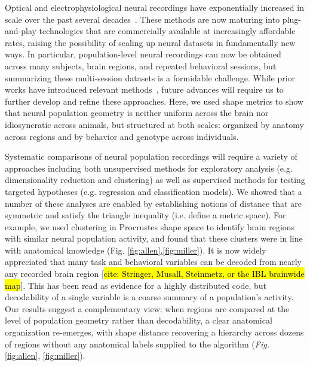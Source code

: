 Optical and electrophysiological neural recordings have exponentially increased in scale over the past several decades~\parencite{stevenson2011advances,urai2022large}.
These methods are now maturing into plug-and-play technologies that are commercially available at increasingly affordable rates, raising the possibility of scaling up neural datasets in fundamentally new ways.
In particular, population-level neural recordings can now be obtained across many subjects, brain regions, and repeated behavioral sessions, but summarizing these multi-session datasets is a formidable challenge.
While prior works have introduced relevant methods~\parencite[see][for a review]{klabunde2023similarity}, future advances will require us to further develop and refine these approaches.
Here, we used shape metrics to show that neural population geometry is neither uniform across the brain nor idiosyncratic across animals, but structured at both scales: organized by anatomy across regions and by behavior and genotype across individuals.


Systematic comparisons of neural population recordings will require a variety of approaches including both unsupervised methods for exploratory analysis (e.g. dimensionality reduction and clustering) as well as supervised methods for testing targeted hypotheses (e.g. regression and classification models).
We showed that a number of these analyses are enabled by establishing notions of distance that are symmetric and satisfy the triangle inequality (i.e. define a metric space).
For example, we used clustering in Procrustes shape space to identify brain regions with similar neural population activity, and found that these clusters were in line with anatomical knowledge (Fig. \ref{fig:allen},\ref{fig:miller}).
It is now widely appreciated that many task and behavioral variables can be decoded from nearly any recorded brain region [\hl{cite: Stringer, Musall, Steinmetz, or the IBL brainwide map}]. This has been read as evidence for a highly distributed code, but decodability of a single variable is a coarse summary of a population's activity. Our results suggest a complementary view: when regions are compared at the level of population geometry rather than decodability, a clear anatomical organization re-emerges, with shape distance recovering a hierarchy across dozens of regions without any anatomical labels supplied to the algorithm (\textit{Fig.} \ref{fig:allen}, \ref{fig:miller}).

